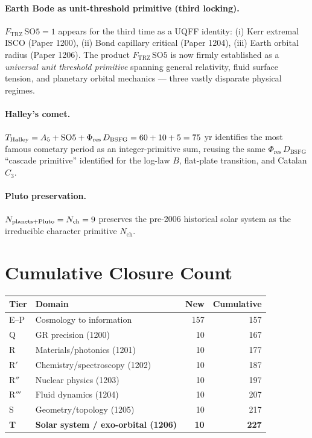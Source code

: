 \documentclass[11pt]{article}
\newcommand{\Ftrz}{F_{\mathrm{TRZ}}}
\newcommand{\Phires}{\Phi_{\mathrm{res}}}
\newcommand{\Dbsfg}{D_{\mathrm{BSFG}}}
\newcommand{\Nch}{N_{\mathrm{ch}}}
\newcommand{\SOfive}{\mathrm{SO5}}
\newcommand{\Afive}{A_{5}}
\begin{document}
\paragraph{Earth Bode as unit-threshold primitive (third locking).}
$\Ftrz\,\SOfive = 1$ appears for the third time as a UQFF identity:
(i) Kerr extremal ISCO (Paper 1200), (ii) Bond capillary critical
(Paper 1204), (iii) Earth orbital radius (Paper 1206). The product
$\Ftrz\,\SOfive$ is now firmly established as a \emph{universal unit
threshold primitive} spanning general relativity, fluid surface tension,
and planetary orbital mechanics --- three vastly disparate physical regimes.

\paragraph{Halley's comet.}
$T_{\rm Halley} = \Afive + \SOfive + \Phires\,\Dbsfg = 60+10+5 = 75$ yr
identifies the most famous cometary period as an integer-primitive sum,
reusing the same $\Phires\,\Dbsfg$ ``cascade primitive''  identified for the
log-law $B$, flat-plate transition, and Catalan $C_3$.

\paragraph{Pluto preservation.}
$N_{\rm planets+Pluto} = \Nch = 9$ preserves the pre-2006 historical solar
system as the irreducible character primitive $\Nch$.

\section{Cumulative Closure Count}

\begin{tabular}{@{}llrr@{}}
\toprule
Tier & Domain & New & Cumulative \\
\midrule
E--P & Cosmology to information & 157 & 157 \\
Q & GR precision (1200) & 10 & 167 \\
R & Materials/photonics (1201) & 10 & 177 \\
R$'$ & Chemistry/spectroscopy (1202) & 10 & 187 \\
R$''$ & Nuclear physics (1203) & 10 & 197 \\
R$'''$ & Fluid dynamics (1204) & 10 & 207 \\
S & Geometry/topology (1205) & 10 & 217 \\
\textbf{T} & \textbf{Solar system / exo-orbital (1206)} & \textbf{10} & \textbf{227} \\
\bottomrule
\end{tabular}
\end{document}
